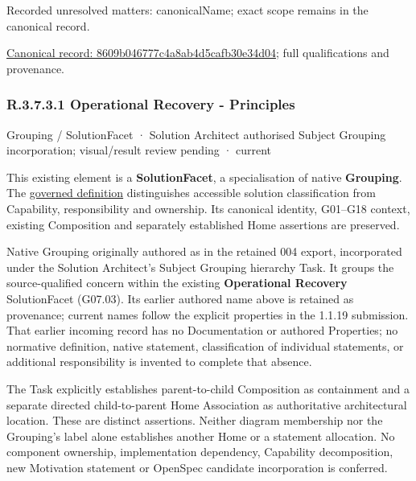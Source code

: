 {\small Recorded unresolved matters: canonicalName; exact scope remains in the canonical record.}\par
{\footnotesize \href{../../../../../../../continuum/grouping/8609b046777c4a8ab4d5cafb30e34d04.md}{Canonical record: 8609b046777c4a8ab4d5cafb30e34d04}; full qualifications and provenance.}\par
\subsubsection*{R.3.7.3.1 Operational Recovery - Principles}
\label{navigation:R.3.7.3.1}

\label{element:901d49996c9545bb99cb0e0e7c043c81}
{\small Grouping / SolutionFacet · Solution Architect authorised Subject Grouping incorporation; visual/result review pending · current}\par

This existing element is a \textbf{SolutionFacet}, a specialisation of native
\textbf{Grouping}. The \href{\detokenize{../../../../../../../governance/continuum-representation.md#solutionfacet-classification--1119-candidate}}{governed definition}
distinguishes accessible solution classification from Capability, responsibility
and ownership. Its canonical identity, G01–G18 context, existing Composition
and separately established Home assertions are preserved.



Native Grouping originally authored as \texttt{} in the retained 004 export,
incorporated under the Solution Architect's Subject Grouping hierarchy Task.
It groups the source-qualified \texttt{} concern within
the existing \textbf{Operational Recovery} SolutionFacet (G07.03). Its earlier authored name above is retained as provenance; current names
follow the explicit properties in the 1.1.19 submission.
That earlier incoming record has no Documentation or authored Properties; no normative
definition, native statement, classification of individual statements, or
additional responsibility is invented to complete that absence.



The Task explicitly establishes parent-to-child Composition as containment and
a separate directed child-to-parent Home Association as authoritative architectural
location. These are distinct assertions. Neither diagram membership nor the
Grouping's label alone establishes another Home or a statement allocation.
No component ownership, implementation dependency, Capability decomposition,
new Motivation statement or OpenSpec candidate incorporation is conferred.




